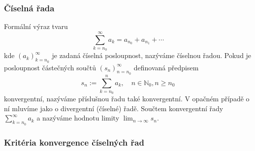 \subsubsection*{Číselná řada}
Formální výraz tvaru \[ \sum_{k=n_0}^\infty a_k = a_{n_0} + a_{n_1} + \cdots\] kde $(a_k)^\infty_{k=n_0}$ je zadaná číselná posloupnost, nazýváme číselnou řadou. Pokud je posloupnost částečných součtů $(s_n)_{n=n_0}^\infty$ definovaná předpisem \[ s_n := \sum^n_{k=n_0} a_k, \quad n\in \mathbb{N}_0, n \geq n_0 \] konvergentní, nazýváme příslušnou řadu také konvergentní. V opačném případě o ní mluvíme jako o divergentní (číselné) řadě. Součtem konvergentní řady $\sum_{k=n_0}^\infty a_k$ a nazýváme hodnotu limity $\lim_{n\to\infty} s_n$.

\subsubsection*{Kritéria konvergence číselných řad}

